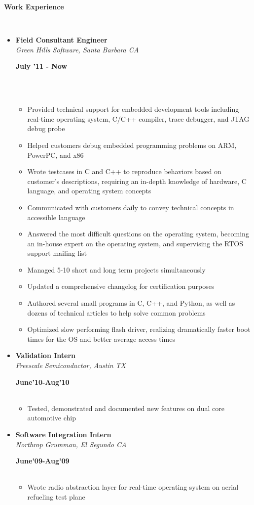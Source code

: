 \documentclass[a4paper,11pt]{article}
\newcommand{\isep}{-1 pt}
\newcommand{\lsep}{-0.2cm}
\newcommand{\resheading}[1]{{\small \colorbox{mygrey}{\begin{minipage}{0.975\textwidth}{\textbf{#1 \vphantom{p\^{E}}}}\end{minipage}}}}
\newcommand{\workexp}[4]{
\begin{minipage}[t]{7cm}
\begin{flushleft}
\textbf{#1} \\
\indent \emph{#2}\\
\end{flushleft}
\end{minipage}
\hfill
\begin{minipage}[t]{7cm}
\begin{flushright}
\textbf{#3} \\
\indent #4 \\
\end{flushright}
\end{minipage}
}
\begin{document}
\resheading{\textbf{Work Experience} }\\[\lsep]
\begin{itemize}
\item 
\workexp{Field Consultant Engineer}{Green Hills Software, Santa Barbara CA}{July '11 - Now}{}
\\[-0.3cm]
	\begin{itemize}\itemsep \isep
	\item Provided technical support for embedded development tools including real-time operating system, C/C++ compiler, trace debugger, and JTAG debug probe
	\item Helped customers debug embedded programming problems on ARM, PowerPC, and x86
	\item Wrote testcases in C and C++ to reproduce behaviors based on customer's descriptions, requiring an in-depth knowledge of hardware, C language, and operating system concepts
	\item Communicated with customers daily to convey technical concepts in accessible language
	\item  Answered the most difficult questions on the operating system, becoming an in-house expert on the operating system, and supervising the RTOS support mailing list
	\item Managed 5-10 short and long term projects simultaneously
	\item Updated a comprehensive changelog for certification purposes
	\item Authored several small programs in C, C++, and Python, as well as dozens of technical articles to help solve common problems
	\item Optimized slow performing flash driver, realizing dramatically faster boot times for the OS and better average access times
	\end{itemize}

\item
\workexp{Validation Intern}{Freescale Semiconductor, Austin TX}{June'10-Aug'10}{}
	\begin{itemize}\itemsep \isep
	\item Tested, demonstrated and documented new features on dual core automotive chip
	\end{itemize}
\item
\workexp{Software Integration Intern}{Northrop Grumman, El Segundo CA}{June'09-Aug'09}{}
	\begin{itemize}\itemsep \isep
	\item Wrote radio abstraction layer for real-time operating system on aerial refueling test plane
	\end{itemize}
\end{itemize}
\end{document}
